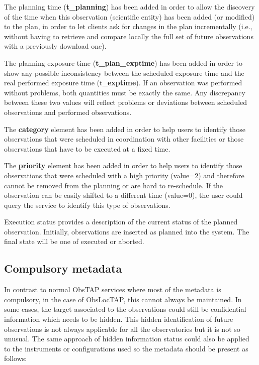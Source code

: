 \documentclass[11pt,a4paper]{ivoa}
\begin{document}
The planning time (\textbf{t\_planning}) has been added in order to allow the discovery of the time when this observation (scientific entity) has been added (or modified) to the plan, in order to let clients ask for changes in the plan incrementally (i.e., without having to retrieve and compare locally the full set of future observations with a previously download one).

The planning exposure time (\textbf{t\_plan\_exptime}) has been added in order to show any possible inconsistency between the scheduled exposure time and the real performed exposure time (t\_\textbf{exptime}). If an observation was performed without problems, both quantities must be exactly the same. Any discrepancy between these two values will reflect problems or deviations between scheduled observations and performed observations.

The \textbf{category} element has been added in order to help users to identify those observations that were scheduled in coordination with other facilities or those observations that have to be executed at a fixed time.

The \textbf{priority} element has been added in order to help users to identify those observations that were scheduled with a high priority (value=2) and therefore cannot be removed from the planning or are hard to re-schedule. If the observation can be easily shifted to a different time (value=0), the user could query the service to identify this type of observations.

Execution status provides a description of the current status of the planned observation. Initially, observations are inserted as planned into the system. The final state will be one of executed or aborted.

\subsection{Compulsory metadata}
In contrast to normal ObsTAP services where most of the metadata is compulsory, in the case of ObsLocTAP, this cannot always be maintained. In some cases, the target associated to the observations could still be confidential information which needs to be hidden. This hidden identification of future observations is not always applicable for all the observatories but it is not so unusual. The same approach of hidden information status could also be applied to the instruments or configurations used so the metadata should be present as follows:
\end{document}
